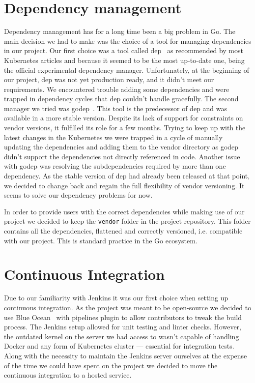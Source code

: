 \section{Dependency management}
Dependency management has for a long time been a big problem in Go. The main decision we had to make
was the choice of a tool for managing dependencies in our project. Our first choice was a tool called
dep~\cite{dep} as recommended by most Kubernetes articles and because it seemed to be the most up-to-date one,
being the official experimental dependency manager. Unfortunately, at the beginning of our project,
dep was not yet production ready, and it didn’t meet our requirements. We encountered trouble adding
some dependencies and were trapped in dependency cycles that dep couldn’t handle gracefully. The
second manager we tried was godep~\cite{godep}. This tool is the predecessor of dep and was available in a more
stable version. Despite its lack of support for constraints on vendor versions, it fulfilled its
role for a few months. Trying to keep up with the latest changes in the Kubernetes we were trapped
in a cycle of manually updating the dependencies and adding them to the vendor directory as godep didn’t
support the dependencies not directly referenced in code. Another issue with godep was resolving the
subdependencies required by more than one dependency. As the stable version of dep had already been
released at that point, we decided to change back and regain the full flexibility of vendor
versioning. It seems to solve our dependency problems for now.

In order to provide users with the correct dependencies while making use of our project we decided
to keep the \texttt{vendor} folder in the project repository. This folder contains all the
dependencies, flattened and correctly versioned, i.e. compatible with our project. This is standard
practice in the Go ecosystem.

\section{Continuous Integration}
Due to our familiarity with Jenkins it was our first choice when setting up continuous integration.
As the project was meant to be open-source we decided to use Blue Ocean~\cite{blueocean} with pipelines plugin to
allow contributors to tweak the build process. The Jenkins setup allowed for unit testing and
linter checks. However, the outdated kernel on the server we had access to wasn’t capable of handling
Docker and any form of Kubernetes cluster --- essential for integration tests. Along with the
necessity to maintain the Jenkins server ourselves at the expense of the time we could have spent
on the project we decided to move the continuous integration to a hosted service.

